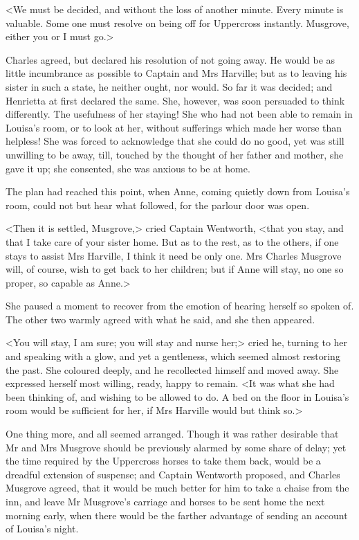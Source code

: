 <We must be decided, and without the loss of another minute. Every minute is valuable. Some one must resolve on being off for Uppercross instantly. Musgrove, either you or I must go.>

Charles agreed, but declared his resolution of not going away. He would be as little incumbrance as possible to Captain and Mrs Harville; but as to leaving his sister in such a state, he neither ought, nor would. So far it was decided; and Henrietta at first declared the same. She, however, was soon persuaded to think differently. The usefulness of her staying! She who had not been able to remain in Louisa's room, or to look at her, without sufferings which made her worse than helpless! She was forced to acknowledge that she could do no good, yet was still unwilling to be away, till, touched by the thought of her father and mother, she gave it up; she consented, she was anxious to be at home.

The plan had reached this point, when Anne, coming quietly down from Louisa's room, could not but hear what followed, for the parlour door was open.

<Then it is settled, Musgrove,> cried Captain Wentworth, <that you stay, and that I take care of your sister home. But as to the rest, as to the others, if one stays to assist Mrs Harville, I think it need be only one. Mrs Charles Musgrove will, of course, wish to get back to her children; but if Anne will stay, no one so proper, so capable as Anne.>

She paused a moment to recover from the emotion of hearing herself so spoken of. The other two warmly agreed with what he said, and she then appeared.

<You will stay, I am sure; you will stay and nurse her;> cried he, turning to her and speaking with a glow, and yet a gentleness, which seemed almost restoring the past. She coloured deeply, and he recollected himself and moved away. She expressed herself most willing, ready, happy to remain. <It was what she had been thinking of, and wishing to be allowed to do. A bed on the floor in Louisa's room would be sufficient for her, if Mrs Harville would but think so.>

One thing more, and all seemed arranged. Though it was rather desirable that Mr and Mrs Musgrove should be previously alarmed by some share of delay; yet the time required by the Uppercross horses to take them back, would be a dreadful extension of suspense; and Captain Wentworth proposed, and Charles Musgrove agreed, that it would be much better for him to take a chaise from the inn, and leave Mr Musgrove's carriage and horses to be sent home the next morning early, when there would be the farther advantage of sending an account of Louisa's night.

